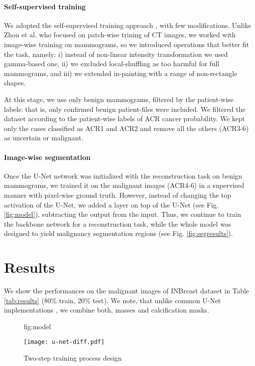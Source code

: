 \documentclass{midl} %
\begin{document}
\paragraph{Self-supervised training}
\label{ssec:selfsup}

We adopted the self-supervised training approach \cite{Zhou2019a}, with few modifications. Unlike Zhou et al. who focused on patch-wise trining of CT images, we worked with image-wise training on mammograms, so we introduced operations that better fit the task, namely: i) instead of non-linear intensity transformation we used gamma-based one, ii) we excluded local-shuffling as too harmful for full mammograms, and iii) we extended in-painting with a range of non-rectangle shapes.

At this stage, we use only benign mammograms, filtered by the patient-wise labels: that is, only confirmed benign patient-files were included. 
We filtered the dataset according to the patient-wise labels of ACR cancer probability. We kept only the cases classified as ACR1 and ACR2 and remove all the others (ACR3-6) as uncertain or malignant. 


\paragraph{Image-wise segmentation}
\label{ssec:discriminative}

Once the U-Net network was initialized with the reconstruction task on benign mammograms, we trained it on the malignant images (ACR4-6) in a supervised manner with pixel-wise ground truth. However, instead of changing the top activation of the U-Net, we added a layer on top of the U-Net (see Fig. \ref{fig:model}), subtracting the output from the input. Thus, we continue to train the backbone network for a reconstruction task, while the whole model was designed to yield malignancy segmentation regions (see Fig. \ref{fig:segresults}).


\section{Results}

We show the performances on the malignant images of INBreast dataset \cite{Moreira2012} in Table \ref{tab:results} (80\% train, 20\% test). We note, that unlike common U-Net implementations \cite{Sun2020}, we combine both, masses and calcification masks.
%
\begin{figure}[htbp]
\floatconts
  {fig:model}
  {\caption{Two-step training process design}}
  {\texttt{[image: u-net-diff.pdf]}}
\end{figure}
\end{document}

